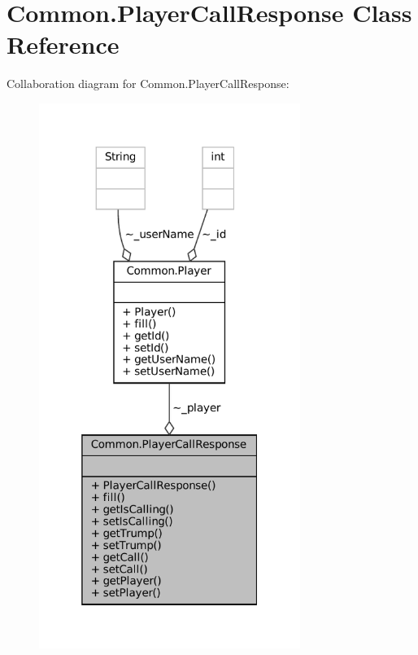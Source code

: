 \hypertarget{classCommon_1_1PlayerCallResponse}{}\section{Common.\+Player\+Call\+Response Class Reference}
\label{classCommon_1_1PlayerCallResponse}


Collaboration diagram for Common.\+Player\+Call\+Response\+:
\nopagebreak
\begin{figure}[H]
\begin{center}
\leavevmode
\includegraphics[width=241pt]{classCommon_1_1PlayerCallResponse__coll__graph}
\end{center}
\end{figure}
